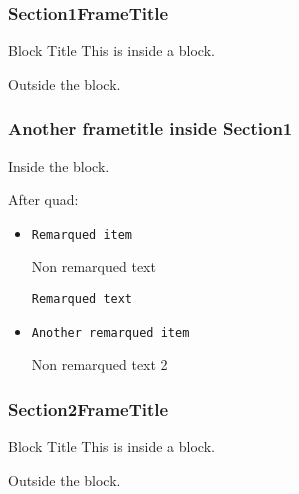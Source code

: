 \documentclass[10pt]{beamer}
\begin{document}
\begin{frame}[fragile]
\frametitle{Section1FrameTitle}

\begin{block}{Block Title}
This is inside a block.


\end{block}

Outside the block.

\end{frame}

\begin{frame}
\frametitle{Another frametitle inside Section1}


\begin{block}{}
Inside the block.
\end{block}


\quad


After quad:

\begin{itemize}

\item {\tt Remarqued item}

Non remarqued text

{\tt Remarqued text} 

 \item {\tt Another remarqued item}

Non remarqued text 2 

\end{itemize}

\end{frame}




\begin{frame}[fragile]
\frametitle{Section2FrameTitle}

\begin{block}{Block Title}
This is inside a block.


\end{block}

Outside the block.

\end{frame}
\end{document}
